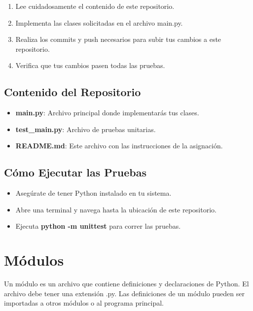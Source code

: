 \documentclass[
  a4paper,
  DIV=11,
  numbers=noendperiod,
  onepage,
  openany]{scrreprt}
\providecommand{\tightlist}{%
  \setlength{\itemsep}{0pt}\setlength{\parskip}{0pt}}\usepackage{longtable,booktabs,array}
\begin{document}
\begin{enumerate}
\def\labelenumi{\arabic{enumi}.}
\tightlist
\item
  Lee cuidadosamente el contenido de este repositorio.
\item
  Implementa las clases solicitadas en el archivo main.py.
\item
  Realiza los commits y push necesarios para subir tus cambios a este
  repositorio.
\item
  Verifica que tus cambios pasen todas las pruebas.
\end{enumerate}

\section{Contenido del Repositorio}\label{contenido-del-repositorio}

\begin{itemize}
\tightlist
\item
  \textbf{main.py}: Archivo principal donde implementarás tus clases.
\item
  \textbf{test\_main.py}: Archivo de pruebas unitarias.
\item
  \textbf{README.md}: Este archivo con las instrucciones de la
  asignación.
\end{itemize}

\section{Cómo Ejecutar las Pruebas}\label{cuxf3mo-ejecutar-las-pruebas}

\begin{itemize}
\tightlist
\item
  Asegúrate de tener Python instalado en tu sistema.
\item
  Abre una terminal y navega hasta la ubicación de este repositorio.
\item
  Ejecuta \textbf{python -m unittest} para correr las pruebas.
\end{itemize}

\chapter{Módulos}\label{muxf3dulos}

Un módulo es un archivo que contiene definiciones y declaraciones de
Python. El archivo debe tener una extensión .py. Las definiciones de un
módulo pueden ser importadas a otros módulos o al programa principal.
\end{document}
